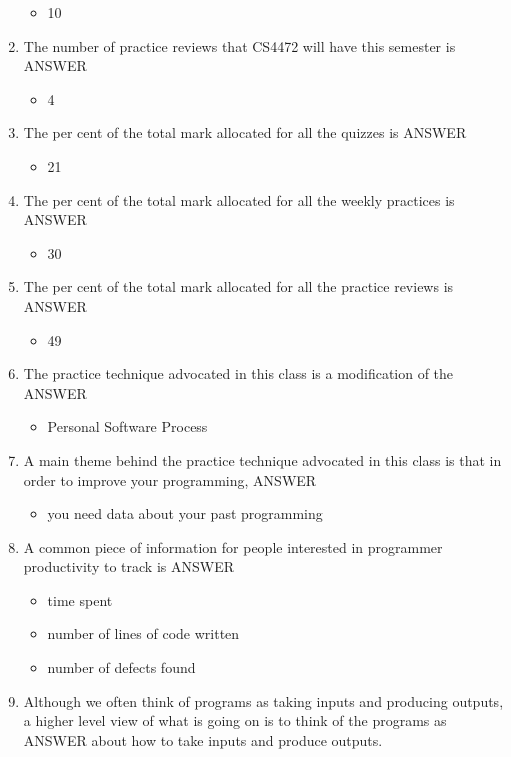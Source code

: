 \documentclass{exam}
\begin{document}
\begin{enumerate}
\begin{itemize}
\item 10
\end{itemize}
\item The number of practice reviews that CS4472 will have this semester is ANSWER
\begin{itemize}
\item 4
\end{itemize}
\item The per cent of the total mark allocated for all the quizzes is ANSWER
\begin{itemize}
\item 21
\end{itemize}
\item The per cent of the total mark allocated for all the weekly practices is ANSWER
\begin{itemize}
\item 30
\end{itemize}
\item The per cent of the total mark allocated for all the practice reviews is ANSWER
\begin{itemize}
\item 49
\end{itemize}
\item The practice technique advocated in this class is a modification of the ANSWER
\begin{itemize}
\item Personal Software Process
\end{itemize}
\item A main theme behind the practice technique advocated in this class is that in order to improve your programming, ANSWER
\begin{itemize}
\item you need data about your past programming
\end{itemize}
\item A common piece of information for people interested in programmer productivity to track is ANSWER
\begin{itemize}
\item time spent
\item number of lines of code written
\item number of defects found
\end{itemize}
\item Although we often think of programs as taking inputs and producing outputs, a higher level view of what is going on is to think of the programs as ANSWER about how to take inputs and produce outputs.

\end{enumerate}
\end{document}
